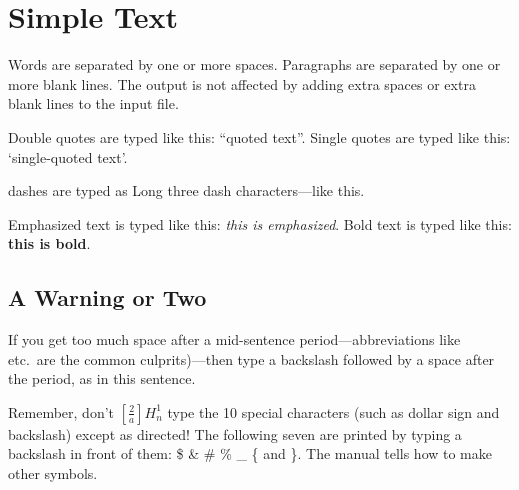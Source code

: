 \documentclass{article}        %
\begin{document}


\section{Simple Text}          %

Words are separated by one or more spaces.  Paragraphs are separated by
one or more blank lines.  The output is not affected by adding extra
spaces or extra blank lines to the input file.

Double quotes are typed like this: ``quoted text''.
Single quotes are typed like this: `single-quoted text'.

dashes are typed as Long three dash characters---like this.

Emphasized text is typed like this: \emph{this is emphasized}.
Bold       text is typed like this: \textbf{this is bold}.

\subsection{A Warning or Two}  %

If you get too much space after a mid-sentence period---abbreviations
like etc.\ are the common culprits)---then type a backslash followed by
a space after the period, as in this sentence.

Remember, don't $\left[\frac2a\right]H_n^1$ type the 10 special characters (such as dollar sign and
backslash) except as directed!  The following seven are printed by
typing a backslash in front of them:  \$  \&  \#  \%  \_  \{  and  \}.  
The manual tells how to make other symbols.
\end{document}
